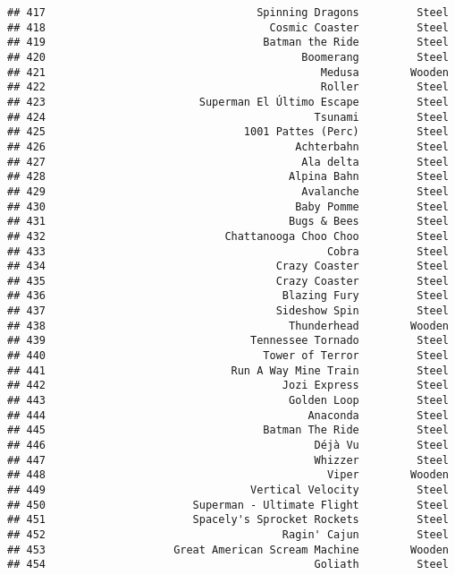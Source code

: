 \documentclass[
]{article}
\begin{document}
\begin{verbatim}
## 417                                 Spinning Dragons         Steel
## 418                                   Cosmic Coaster         Steel
## 419                                  Batman the Ride         Steel
## 420                                        Boomerang         Steel
## 421                                           Medusa        Wooden
## 422                                           Roller         Steel
## 423                        Superman El Último Escape         Steel
## 424                                          Tsunami         Steel
## 425                               1001 Pattes (Perc)         Steel
## 426                                       Achterbahn         Steel
## 427                                        Ala delta         Steel
## 428                                      Alpina Bahn         Steel
## 429                                        Avalanche         Steel
## 430                                       Baby Pomme         Steel
## 431                                      Bugs & Bees         Steel
## 432                            Chattanooga Choo Choo         Steel
## 433                                            Cobra         Steel
## 434                                    Crazy Coaster         Steel
## 435                                    Crazy Coaster         Steel
## 436                                     Blazing Fury         Steel
## 437                                    Sideshow Spin         Steel
## 438                                      Thunderhead        Wooden
## 439                                Tennessee Tornado         Steel
## 440                                  Tower of Terror         Steel
## 441                             Run A Way Mine Train         Steel
## 442                                     Jozi Express         Steel
## 443                                      Golden Loop         Steel
## 444                                         Anaconda         Steel
## 445                                  Batman The Ride         Steel
## 446                                          Déjà Vu         Steel
## 447                                          Whizzer         Steel
## 448                                            Viper        Wooden
## 449                                Vertical Velocity         Steel
## 450                       Superman - Ultimate Flight         Steel
## 451                       Spacely's Sprocket Rockets         Steel
## 452                                     Ragin' Cajun         Steel
## 453                    Great American Scream Machine        Wooden
## 454                                          Goliath         Steel

\end{verbatim}
\end{document}
